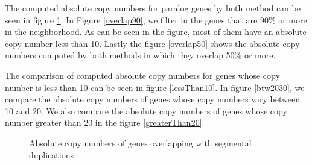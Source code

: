 The computed absolute copy numbers for paralog genes by both method can be seen in figure \ref{unfiltered}. In Figure \ref{overlap90}, we filter in the genes that are 90\% or more in the neighborhood. As can be seen in the figure, most of them have an absolute copy number less than 10. Lastly the figure \ref{overlap50} shows the absolute copy numbers computed by both methods in which they overlap 50\% or more.

The comparison of computed absolute copy numbers for genes whose copy number is less than 10 can be seen in figure \ref{lessThan10}. In figure \ref{btw2030}, we compare the absolute copy numbers of genes whose copy numbers vary between 10 and 20. We also compare the absolute copy numbers of genes whose copy number greater than 20 in the figure \ref{greaterThan20}.


\begin{figure}
    \centering
    \quad
    \caption{Absolute copy numbers of genes overlapping with segmental duplications}
    \label{unfiltered}
\end{figure}

